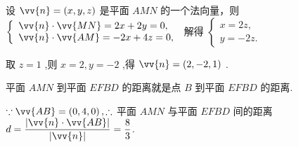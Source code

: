 \begin{enumerate}
\begin{jieda}
        设 $\vv{n} = \left( {x,y,z}\right)$ 是平面 ${AMN}$ 的一个法向量，则 $\left\{  \begin{array}{l} \vv{n} \cdot  \vv{MN} = {2x} + {2y} = 0, \\  \vv{n} \cdot  \vv{AM} =  - {2x} + {4z} = 0, \end{array}\right.$ 解得 $\left\{  \begin{array}{l} x = {2z}, \\  y =  - {2z}. \end{array}\right.$

        取 $z = 1$ ,则 $x = 2,y =  - 2$ ,得 $\vv{n} = \left( {2, - 2,1}\right)$ .

        平面 ${AMN}$ 到平面 ${EFBD}$ 的距离就是点 $B$ 到平面 ${EFBD}$ 的距离.

        $\because \vv{AB} = \left( {0,4,0}\right) ,\therefore$ 平面 ${AMN}$ 与平面 ${EFBD}$ 间的距离 $d = \dfrac{\left| \vv{n} \cdot  \vv{AB}\right| }{\left| \vv{n}\right| } = \dfrac{8}{3}$.
    \end{jieda}
\end{enumerate}


